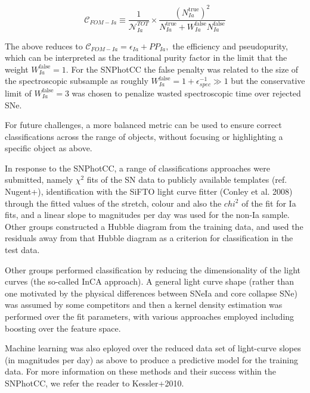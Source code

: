 \begin{equation}
\mathscr{C}_{FOM-Ia} \equiv \frac{1}{\mathscr{N}_{Ia}^{TOT}}\times \frac{(N_{Ia}^{\mathrm{true}})^2}{N_{Ia}^\mathrm{true}+W_{Ia}^\mathrm{false}N_{Ia}^\mathrm{false}} 
\end{equation}

The above reduces to $\mathscr{C}_{FOM-Ia}  = \epsilon_{Ia} + PP_{Ia},$ the efficiency and pseudopurity, which can be interpreted as the traditional purity factor in the limit that the weight $W_{Ia}^\mathrm{false} = 1.$ For the SNPhotCC the false penalty was related to the size of the spectroscopic subsample as roughly $W_{Ia}^\mathrm{false} = 1+\epsilon_{spec}^{-1} \gg 1$ but the conservative limit of $W_{Ia}^\mathrm{false} = 3$ was chosen to penalize wasted spectroscopic time over rejected SNe.

For future challenges, a more balanced metric can be used to ensure correct classifications across the range of objects, without focusing or highlighting a specific object as above.




In response to the SNPhotCC, a range of classifications approaches were submitted, namely $\chi^2$ fits of the SN data to publicly available templates (ref. Nugent+), identification with the SiFTO light curve fitter (Conley et al. 2008) through the fitted values of the stretch, colour and also the $chi^2$ of the fit for Ia fits, and a linear slope to magnitudes per day was used for the non-Ia sample. Other groups constructed a Hubble diagram from the training data, and used the residuals away from that Hubble diagram as a criterion for classification in the test data.

Other groups performed classification by reducing the dimensionality of the light curves (the so-called InCA approach). A general light curve shape (rather than one motivated by the physical differences between SNeIa and core collapse SNe) was assumed by some competitors and then a kernel density estimation was performed over the fit parameters, with various approaches employed including boosting over the feature space.


Machine learning was also eployed over the reduced data set of light-curve slopes (in magnitudes per day) as above to produce a predictive model for the training data. For more information on these methods and their success within the SNPhotCC, we refer the reader to Kessler+2010. 


